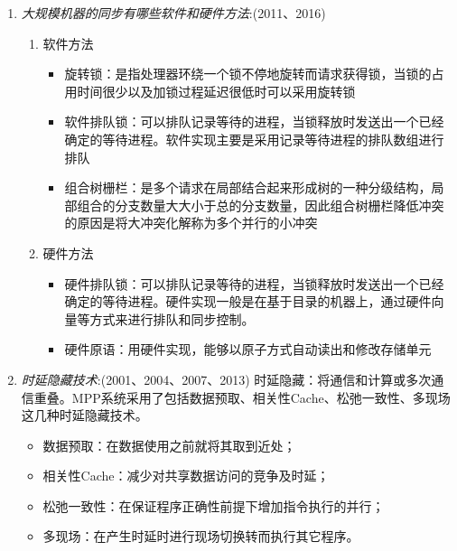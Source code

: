 \documentclass[a4paper]{ctexart}
\begin{document}
\begin{enumerate}
  \item \emph{大规模机器的同步有哪些软件和硬件方法}:(2011、2016)
  \begin{enumerate}
    \item 软件方法
    \begin{itemize}
      \item 旋转锁：是指处理器环绕一个锁不停地旋转而请求获得锁，当锁的占用时间很少以及加锁过程延迟很低时可以采用旋转锁
      \item 软件排队锁：可以排队记录等待的进程，当锁释放时发送出一个已经确定的等待进程。软件实现主要是采用记录等待进程的排队数组进行排队
      \item 组合树栅栏：是多个请求在局部结合起来形成树的一种分级结构，局部组合的分支数量大大小于总的分支数量，因此组合树栅栏降低冲突的原因是将大冲突化解称为多个并行的小冲突
    \end{itemize}
    \item 硬件方法
    \begin{itemize}
      \item 硬件排队锁：可以排队记录等待的进程，当锁释放时发送出一个已经确定的等待进程。硬件实现一般是在基于目录的机器上，通过硬件向量等方式来进行排队和同步控制。
      \item 硬件原语：用硬件实现，能够以原子方式自动读出和修改存储单元
    \end{itemize}
  \end{enumerate}
  
  \item \emph{时延隐藏技术}:(2001、2004、2007、2013)
  时延隐藏：将通信和计算或多次通信重叠。MPP系统采用了包括数据预取、相关性Cache、松弛一致性、多现场这几种时延隐藏技术。
  \begin{itemize}
    \item 数据预取：在数据使用之前就将其取到近处；
    \item 相关性Cache：减少对共享数据访问的竞争及时延；
    \item 松弛一致性：在保证程序正确性前提下增加指令执行的并行；
    \item 多现场：在产生时延时进行现场切换转而执行其它程序。
  \end{itemize}
  
\end{enumerate}
\end{document}
